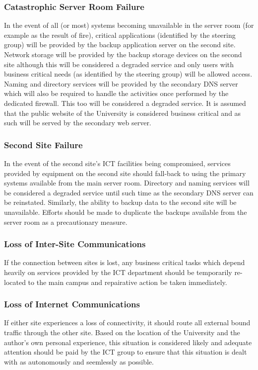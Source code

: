 \documentclass[a4paper, twoside]{article}
\begin{document}
\subsubsection{Catastrophic Server Room Failure}
In the event of all (or most) systems becoming unavailable in the server room
(for example as the result of fire), critical applications (identified by the
steering group) will be provided by the backup application server on the second
site. Network storage will be provided by the backup storage devices on the
second site although this will be considered a degraded service and only users
with business critical needs (as identified by the steering group) will be
allowed access. Naming and directory services will be provided by the secondary
DNS server which will also be required to handle the activities once performed
by the dedicated firewall. This too will be considered a degraded service. It is
assumed that the public website of the University is considered business
critical and as such will be served by the secondary web server.

\subsubsection{Second Site Failure}
In the event of the second site's ICT facilities being compromised, services
provided by equipment on the second site should fall-back to using the primary
systems available from the main server room. Directory and naming services will
be considered a degraded service until such time as the secondary DNS server can
be reinstated. Similarly, the ability to backup data to the second site will be
unavailable. Efforts should be made to duplicate the backups available from the
server room as a precautionary measure.

\subsubsection{Loss of Inter-Site Communications}
If the connection between sites is lost, any business critical tasks which
depend heavily on services provided by the ICT department should be temporarily
re-located to the main campus and repairative action be taken immediately.

\subsubsection{Loss of Internet Communications}
If either site experiences a loss of connectivity, it should route all external
bound traffic through the other site. Based on the location of the University
and the author's own personal experience, this situation is considered likely
and adequate attention should be paid by the ICT group to ensure that this
situation is dealt with as autonomously and seemlessly as possible.
\end{document}
